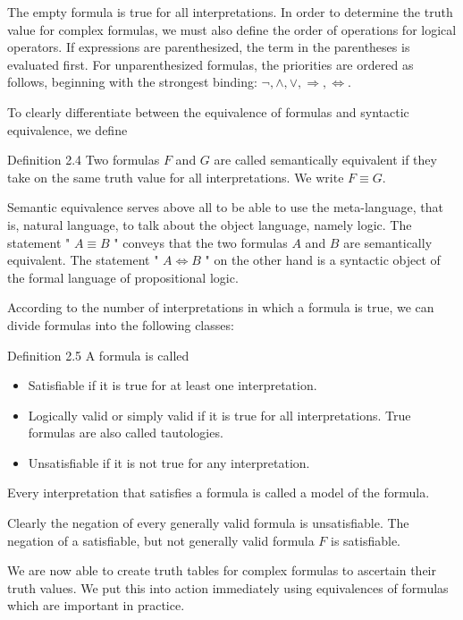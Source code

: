 \documentclass[10pt]{book}
\begin{document}
The empty formula is true for all interpretations. In order to determine the truth value for complex formulas, we must also define the order of operations for logical operators. If expressions are parenthesized, the term in the parentheses is evaluated first. For unparenthesized formulas, the priorities are ordered as follows, beginning with the strongest binding: $\neg, \wedge, \vee, \Rightarrow, \Leftrightarrow$.

To clearly differentiate between the equivalence of formulas and syntactic equivalence, we define

Definition 2.4 Two formulas $F$ and $G$ are called semantically equivalent if they take on the same truth value for all interpretations. We write $F \equiv G$.

Semantic equivalence serves above all to be able to use the meta-language, that is, natural language, to talk about the object language, namely logic. The statement " $A \equiv B$ " conveys that the two formulas $A$ and $B$ are semantically equivalent. The statement " $A \Leftrightarrow B$ " on the other hand is a syntactic object of the formal language of propositional logic.

According to the number of interpretations in which a formula is true, we can divide formulas into the following classes:

Definition 2.5 A formula is called

\begin{itemize}
  \item Satisfiable if it is true for at least one interpretation.
  \item Logically valid or simply valid if it is true for all interpretations. True formulas are also called tautologies.
  \item Unsatisfiable if it is not true for any interpretation.
\end{itemize}

Every interpretation that satisfies a formula is called a model of the formula.

Clearly the negation of every generally valid formula is unsatisfiable. The negation of a satisfiable, but not generally valid formula $F$ is satisfiable.

We are now able to create truth tables for complex formulas to ascertain their truth values. We put this into action immediately using equivalences of formulas which are important in practice.
\end{document}
